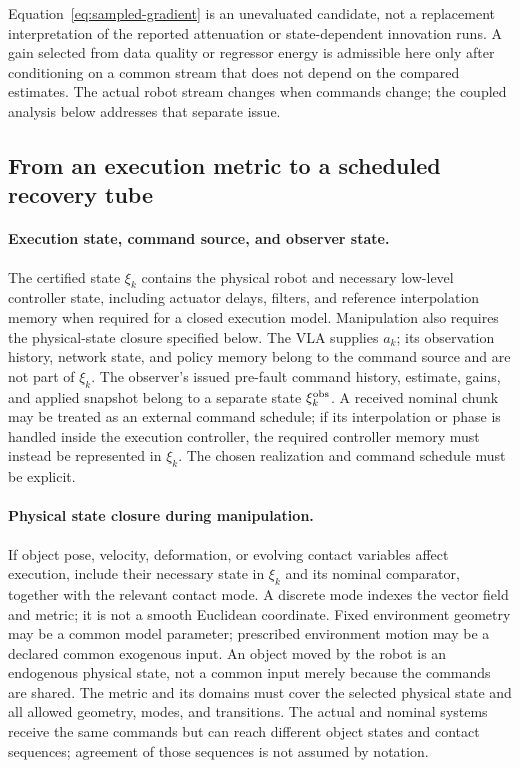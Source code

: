 Equation~\eqref{eq:sampled-gradient} is an unevaluated candidate, not a
replacement interpretation of the reported attenuation or state-dependent
innovation runs. A gain selected from data quality or regressor energy is
admissible here only after conditioning on a common stream that does not
depend on the compared estimates. The actual robot stream changes when
commands change; the coupled analysis below addresses that separate issue.

\subsection{From an execution metric to a scheduled recovery tube}
\label{app:history-partition}

\paragraph{Execution state, command source, and observer state.}
The certified state $\xi_k$ contains the physical robot and necessary
low-level controller state, including actuator delays, filters, and reference
interpolation memory when required for a closed execution model. Manipulation
also requires the physical-state closure specified below. The VLA
supplies $a_k$; its observation history, network state, and policy
memory belong to the command source and are not part of $\xi_k$. The
observer's issued pre-fault command history, estimate, gains, and applied
snapshot belong to a separate state $\xi_k^{\rm obs}$. A received nominal
chunk may be treated as an external command schedule; if its interpolation
or phase is handled inside the execution controller, the required controller
memory must instead be represented in $\xi_k$. The chosen realization and
command schedule must be explicit.

\paragraph{Physical state closure during manipulation.}
\label{app:physical-closure}
If object pose, velocity, deformation, or evolving contact variables affect
execution, include their necessary state in $\xi_k$ and its nominal
comparator, together with the relevant contact mode. A discrete mode
indexes the vector field and metric; it is not a smooth Euclidean coordinate.
Fixed environment
geometry may be a common model parameter; prescribed environment motion may
be a declared common exogenous input. An object moved by the robot is an
endogenous physical state, not a common input merely because the commands
are shared. The metric and its domains must cover the selected physical
state and all allowed geometry, modes, and transitions. The actual and nominal
systems receive the same commands but can reach different object states and
contact sequences; agreement of those sequences is not assumed by notation.

